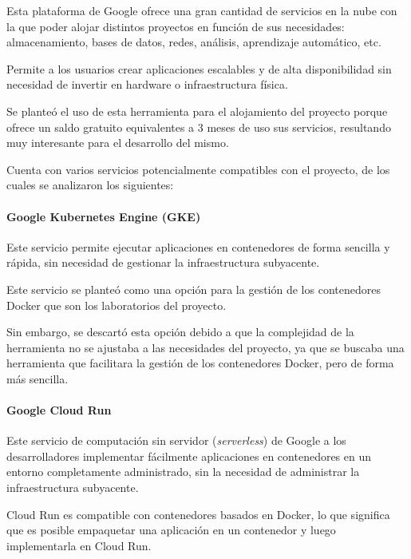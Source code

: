                 Esta plataforma de Google ofrece una gran cantidad de servicios en la nube con la que poder alojar distintos proyectos en función de sus necesidades: almacenamiento, bases de datos, redes, análisis, aprendizaje automático, etc.
                
                Permite a los usuarios crear aplicaciones escalables y de alta disponibilidad sin necesidad de invertir en hardware o infraestructura física.

                Se planteó el uso de esta herramienta para el alojamiento del proyecto porque ofrece un saldo gratuito equivalentes a 3 meses de uso sus servicios, resultando muy interesante para el desarrollo del mismo.

                Cuenta con varios servicios potencialmente compatibles con el proyecto, de los cuales se analizaron los siguientes:

                \paragraph{Google Kubernetes Engine (GKE)}

                    Este servicio permite ejecutar aplicaciones en contenedores de forma sencilla y rápida, sin necesidad de gestionar la infraestructura subyacente.

                    Este servicio se planteó como una opción para la gestión de los contenedores Docker que son los laboratorios del proyecto.

                    Sin embargo, se descartó esta opción debido a que la complejidad de la herramienta no se ajustaba a las necesidades del proyecto, ya que se buscaba una herramienta que facilitara la gestión de los contenedores Docker, pero de forma más sencilla.

                \paragraph{Google Cloud Run}

                    Este servicio de computación sin servidor (\textit{serverless}) de Google a los desarrolladores implementar fácilmente aplicaciones en contenedores en un entorno completamente administrado, sin la necesidad de administrar la infraestructura subyacente.
                    
                    Cloud Run es compatible con contenedores basados en Docker, lo que significa que es posible empaquetar una aplicación en un contenedor y luego implementarla en Cloud Run.

